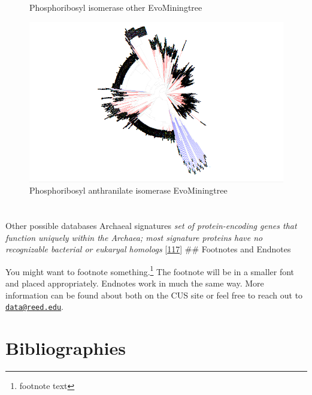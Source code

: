 \documentclass[12pt,twoside]{reedthesis}
\begin{document}
\begin{figure}[h!tbp]
  \caption[Phosphoribosyl isomerase other EvoMiningtree]{\normalsize{Phosphoribosyl isomerase other EvoMiningtree}}
  \label{fig:Phosphoribosyl_isomerase_other_evo_tree}
  \end{figure}\begin{figure}[h!tbp]
  \centering
  \includegraphics[angle = 180,scale = 0.25]{chapter3/tree65.png}
  \caption[Phosphoribosyl anthranilate isomerase EvoMiningtree]{\normalsize{Phosphoribosyl anthranilate isomerase EvoMiningtree}}
  \label{fig:Phosphoribosylanthranilate_isomerase_evo_tree}
  \end{figure}
  
  \clearpage 
  
  \hypertarget{section}{\section{}\label{section}}
  
  Other possible databases Archaeal signatures \emph{set of
  protein-encoding genes that function uniquely within the Archaea; most
  signature proteins have no recognizable bacterial or eukaryal homologs}
  {[}\protect\hyperlink{ref-grahamux5farchaealux5f2000}{117}{]} \#\#
  Footnotes and Endnotes
  
  You might want to footnote something.\footnote{footnote text} The
  footnote will be in a smaller font and placed appropriately. Endnotes
  work in much the same way. More information can be found about both on
  the CUS site or feel free to reach out to
  \href{mailto:data@reed.edu}{\nolinkurl{data@reed.edu}}.
  
  \section{Bibliographies}\label{bibliographies}
  
\end{document}
